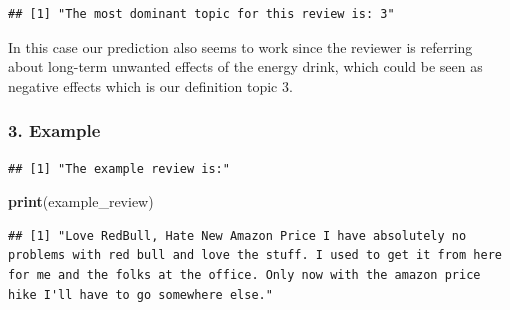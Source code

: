 \documentclass[
]{article}
\newenvironment{Shaded}{\begin{snugshade}}{\end{snugshade}}
\newcommand{\CommentTok}[1]{\textcolor[rgb]{0.56,0.35,0.01}{\textit{#1}}}
\newcommand{\DecValTok}[1]{\textcolor[rgb]{0.00,0.00,0.81}{#1}}
\newcommand{\FloatTok}[1]{\textcolor[rgb]{0.00,0.00,0.81}{#1}}
\newcommand{\FunctionTok}[1]{\textcolor[rgb]{0.13,0.29,0.53}{\textbf{#1}}}
\newcommand{\NormalTok}[1]{#1}
\newcommand{\OtherTok}[1]{\textcolor[rgb]{0.56,0.35,0.01}{#1}}
\newcommand{\SpecialCharTok}[1]{\textcolor[rgb]{0.81,0.36,0.00}{\textbf{#1}}}
\newcommand{\StringTok}[1]{\textcolor[rgb]{0.31,0.60,0.02}{#1}}
\begin{document}
\begin{verbatim}
## [1] "The most dominant topic for this review is: 3"
\end{verbatim}

In this case our prediction also seems to work since the reviewer is
referring about long-term unwanted effects of the energy drink, which
could be seen as negative effects which is our definition topic 3.

\hypertarget{example-2}{%
\subsubsection{3. Example}\label{example-2}}

\begin{Shaded}
\end{Shaded}

\begin{verbatim}
## [1] "The example review is:"
\end{verbatim}

\begin{Shaded}
\begin{Highlighting}[]
\FunctionTok{print}\NormalTok{(example\_review)}
\end{Highlighting}
\end{Shaded}

\begin{verbatim}
## [1] "Love RedBull, Hate New Amazon Price I have absolutely no problems with red bull and love the stuff. I used to get it from here for me and the folks at the office. Only now with the amazon price hike I'll have to go somewhere else."
\end{verbatim}

\begin{Shaded}
\end{Shaded}
\end{document}
